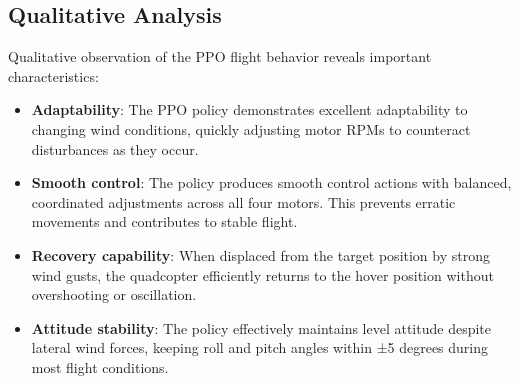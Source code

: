 \documentclass[12pt]{article}
\begin{document}

\subsection{Qualitative Analysis}

Qualitative observation of the PPO flight behavior reveals important characteristics:


\begin{itemize}
    \item \textbf{Adaptability}: The PPO policy demonstrates excellent adaptability to changing wind conditions, quickly adjusting motor RPMs to counteract disturbances as they occur.
    
    \item \textbf{Smooth control}: The policy produces smooth control actions with balanced, coordinated adjustments across all four motors. This prevents erratic movements and contributes to stable flight.
    
    \item \textbf{Recovery capability}: When displaced from the target position by strong wind gusts, the quadcopter efficiently returns to the hover position without overshooting or oscillation.
    
    \item \textbf{Attitude stability}: The policy effectively maintains level attitude despite lateral wind forces, keeping roll and pitch angles within ±5 degrees during most flight conditions.
\end{itemize}

%     
%     
%     
\end{document}
